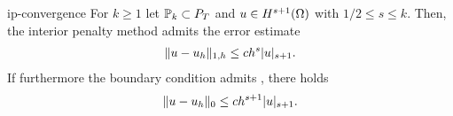 \begin{Theorem}{ip-convergence}
  For $k\ge 1$ let $\mathbb P_k\subset P_T$ and $u\in H^{s+1}(\Omega)$ with
  $1/2 \le s \le k$. Then, the interior penalty method admits the
  error estimate
  \begin{gather}
    \lVert u-u_h\rVert_{1,h} \le c h^s \lvert u\rvert_{s+1}.
  \end{gather}
  If furthermore the boundary condition admits ,
there holds
  \begin{gather}
    \lVert u-u_h\rVert_{0} \le c h^{s+1} \lvert u\rvert_{s+1}.
  \end{gather}
\end{Theorem}





